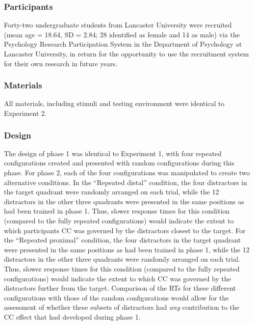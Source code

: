 \documentclass[
  man,
  floatsintext,
  longtable,
  nolmodern,
  notxfonts,
  notimes,
  colorlinks=true,linkcolor=blue,citecolor=blue,urlcolor=blue]{apa7}
\begin{document}
\subsubsection{Participants}\label{participants-2}

Forty-two undergraduate students from Lancaster University were
recruited (mean age = 18.64, SD = 2.84; 28 identified as female and 14
as male) via the Psychology Research Participation System in the
Department of Psychology at Lancaster University, in return for the
opportunity to use the recruitment system for their own research in
future years.

\subsubsection{Materials}\label{materials-2}

All materials, including stimuli and testing environment were identical
to Experiment 2.

\subsubsection{Design}\label{design-2}

The design of phase 1 was identical to Experiment 1, with four repeated
configurations created and presented with random configurations during
this phase. For phase 2, each of the four configurations was manipulated
to create two alternative conditions. In the ``Repeated distal''
condition, the four distractors in the target quadrant were randomly
arranged on each trial, while the 12 distractors in the other three
quadrants were presented in the same positions as had been trained in
phase 1. Thus, slower response times for this condition (compared to the
fully repeated configurations) would indicate the extent to which
participants CC was governed by the distractors closest to the target.
For the ``Repeated proximal'' condition, the four distractors in the
target quadrant were presented in the same positions as had been trained
in phase 1, while the 12 distractors in the other three quadrants were
randomly arranged on each trial. Thus, slower response times for this
condition (compared to the fully repeated configurations) would indicate
the extent to which CC was governed by the distractors further from the
target. Comparison of the RTs for these different configurations with
those of the random configurations would allow for the assessment of
whether these subsets of distractors had \emph{any} contribution to the
CC effect that had developed during phase 1.
\end{document}

